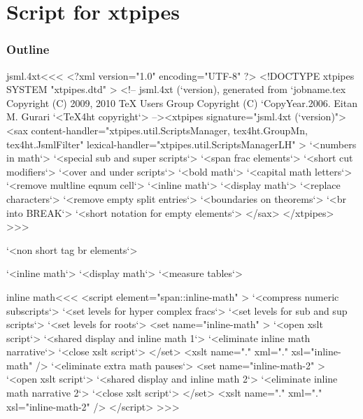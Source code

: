 \documentclass{article}
\begin{document}



\part{Script for xtpipes}


\section{Outline}




\<jsml.4xt\><<<
<?xml version="1.0" encoding="UTF-8" ?>
<!DOCTYPE xtpipes SYSTEM "xtpipes.dtd" >
<!-- jsml.4xt (`version), generated from `jobname.tex
     Copyright (C) 2009, 2010 TeX Users Group
     Copyright (C) `CopyYear.2006. Eitan M. Gurari
`<TeX4ht copyright`> --><xtpipes signature="jsml.4xt (`version)">
   <sax content-handler="xtpipes.util.ScriptsManager, tex4ht.GroupMn, tex4ht.JsmlFilter" 
        lexical-handler="xtpipes.util.ScriptsManagerLH" >
     `<numbers in math`>
     `<special sub and super scripts`> 
     `<span frac elements`>
     `<short cut modifiers`>
     `<over and under scripts`>
     `<bold math`>
     `<capital math letters`>
     `<remove multline eqnum cell`> 
     `<inline math`>
     `<display math`>
     `<replace characters`>
     `<remove empty split entries`>
     `<boundaries on theorems`>
     `<br into BREAK`>
     `<short notation for empty elements`>
   </sax>
</xtpipes>
>>>


     `<non short tag br elements`>     

     `<inline math`>
     `<display math`>
     `<measure tables`>




\<inline math\><<<
<script element="span::inline-math" >
  `<compress numeric subscripts`>
  `<set levels for hyper complex fracs`>
  `<set levels for sub and sup scripts`>
  `<set levels for roots`>
  <set name="inline-math" >
     `<open xslt script`>
     `<shared display and inline math 1`>
     `<eliminate inline math narrative`>
     `<close xslt script`>
  </set>
  <xslt name="." xml="." xsl="inline-math" />
  `<eliminate extra math pauses`>
  <set name="inline-math-2" >
     `<open xslt script`>
     `<shared display and inline math 2`>
     `<eliminate inline math narrative 2`>
     `<close xslt script`>
  </set>
  <xslt name="." xml="." xsl="inline-math-2" />
</script> 
>>>
\end{document}
